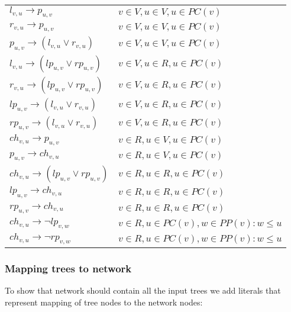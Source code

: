 \documentclass[runningheads, envcountsame, a4paper]{llncs}
\begin{document}
\begin{table}
{\begin{tabular}{l | l}
  \hline
  $l_{v,u} \rightarrow p_{u,v}$ &
  $v \in V, u \in V, u \in PC(v)$
  \\
  $r_{v,u} \rightarrow p_{u,v}$ &
  $v \in V, u \in V, u \in PC(v)$
  \\
  $p_{u,v} \rightarrow (l_{v,u} \vee r_{v,u})$ &
  $v \in V, u \in V, u \in PC(v)$
  \\
  
  \hline
  $l_{v,u} \rightarrow (lp_{u,v} \vee rp_{u,v})$ &
  $v \in V, u \in R, u \in PC(v)$
  \\
  $r_{v,u} \rightarrow (lp_{u,v} \vee rp_{u,v})$ &
  $v \in V, u \in R, u \in PC(v)$
  \\
  $lp_{u,v} \rightarrow (l_{v,u} \vee r_{v,u})$ &
  $v \in V, u \in R, u \in PC(v)$
  \\
  $rp_{u,v} \rightarrow (l_{v,u} \vee r_{v,u})$ &
  $v \in V, u \in R, u \in PC(v)$
  \\
  
  \hline 
  $ch_{v,u} \rightarrow p_{u,v}$ &
  $v \in R, u \in V, u \in PC(v)$
  \\
  $p_{u,v} \rightarrow ch_{v,u}$ &
  $v \in R, u \in V, u \in PC(v)$
  \\
  
  \hline
  $ch_{v,u} \rightarrow (lp_{u,v} \vee rp_{u,v})$ &
  $v \in R, u \in R, u \in PC(v)$
  \\
  $lp_{u,v} \rightarrow ch_{v,u}$ &
  $v \in R, u \in R, u \in PC(v)$
  \\
  $rp_{u,v} \rightarrow ch_{v,u}$ &
  $v \in R, u \in R, u \in PC(v)$
  \\
  
  \hline
  $ch_{v,u} \rightarrow \neg lp_{v,w}$ &
  $v \in R, u \in PC(v), w \in PP(v): w \leq u$
  \\
  $ch_{v,u} \rightarrow \neg rp_{v,w}$ &
  $v \in R, u \in PC(v), w \in PP(v): w \leq u$
  \\
  
\end{tabular}
}
\label{network-table}
\end{table}

\subsubsection{Mapping trees to network}

To show that network should contain all the input trees we add literals that represent mapping of tree nodes to 
the network nodes:
\end{document}
